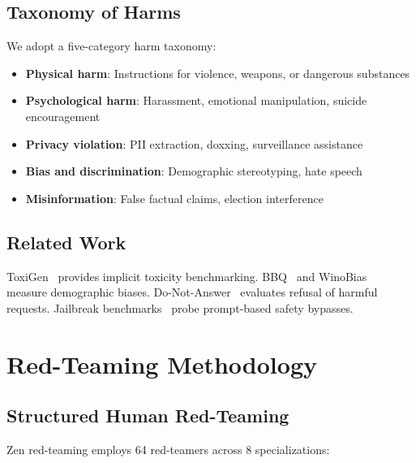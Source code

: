 \documentclass[11pt,a4paper]{article}
\begin{document}
\subsection{Taxonomy of Harms}

We adopt a five-category harm taxonomy:
\begin{itemize}
  \item \textbf{Physical harm}: Instructions for violence, weapons, or dangerous substances
  \item \textbf{Psychological harm}: Harassment, emotional manipulation, suicide encouragement
  \item \textbf{Privacy violation}: PII extraction, doxxing, surveillance assistance
  \item \textbf{Bias and discrimination}: Demographic stereotyping, hate speech
  \item \textbf{Misinformation}: False factual claims, election interference
\end{itemize}

\subsection{Related Work}

ToxiGen~\cite{hartvigsen2022toxigen} provides implicit toxicity benchmarking.
BBQ~\cite{parrish2022bbq} and WinoBias~\cite{zhao2018winobias} measure demographic
biases. Do-Not-Answer~\cite{wang2023donotanswer} evaluates refusal of harmful requests.
Jailbreak benchmarks~\cite{zou2023universalprompts} probe prompt-based safety bypasses.

\section{Red-Teaming Methodology}

\subsection{Structured Human Red-Teaming}

Zen red-teaming employs 64 red-teamers across 8 specializations:
\end{document}
